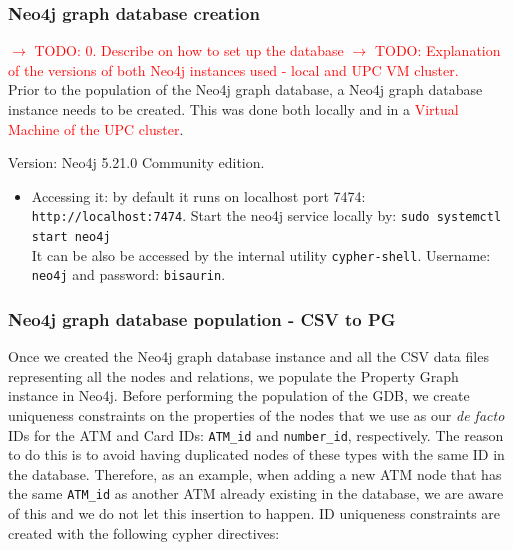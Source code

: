 
\subsubsection{Neo4j graph database creation}
\textcolor{red}{$\rightarrow$ TODO: 0. Describe on how to set up the database}
\textcolor{red}{$\rightarrow$ TODO: Explanation of the versions of both Neo4j instances used - local and UPC VM cluster.}\\

Prior to the population of the Neo4j graph database, a Neo4j graph database instance needs to be
created. This was done both locally and in a \textcolor{red}{Virtual Machine of the UPC cluster}.

Version: Neo4j 5.21.0 Community edition. 
\begin{itemize}
    \item Accessing it: by default it runs on localhost port 7474: \texttt{http://localhost:7474}.
    Start the neo4j service locally by: \texttt{sudo systemctl start neo4j}\\
    It can be also be accessed by the internal utility \texttt{cypher-shell}. Username: \texttt{neo4j} and password: \texttt{bisaurin}.
\end{itemize}

\subsubsection{Neo4j graph database population - CSV to PG}

Once we created the Neo4j graph database instance and all the CSV data files representing all the nodes and relations, we populate the Property Graph instance in Neo4j. Before performing the population of the GDB, we create uniqueness constraints on the properties of the nodes that we use as our \emph{de facto} IDs for the ATM and Card IDs: \texttt{ATM\_id} and \texttt{number\_id}, respectively. The reason to do this is to avoid having duplicated nodes of these types with the same ID in the database. Therefore, as an example, when adding a new ATM node that has the same \texttt{ATM\_id} as another ATM already existing in the database, we are aware of this and we do not let this insertion to happen. ID uniqueness constraints are created with the following cypher directives:

